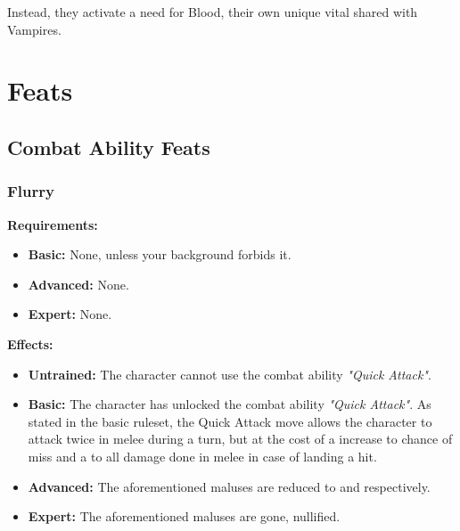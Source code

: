 \documentclass[openany,10pt,a4paper]{book}
\begin{document}
 Instead, they activate a need for Blood, their own unique vital shared with Vampires.\newpage
\chapter{Feats}
\section{Combat Ability Feats}
\subsection{Flurry}
\begin{table}[!ht]
\centering
{}
\end{table}
\textbf{Requirements:}
\begin{itemize}
	\item \textbf{Basic:} None, unless your background forbids it.
	\item \textbf{Advanced:} None.
	\item \textbf{Expert:} None.
\end{itemize}
\textbf{Effects:}
\begin{itemize}
	\item \textbf{Untrained:} The character cannot use the combat ability \textit{"Quick Attack"}.
	\item \textbf{Basic:} The character has unlocked the combat ability \textit{"Quick Attack"}. As stated in the basic ruleset, the Quick Attack move allows the character to attack twice in melee during a turn, but at the cost of a  increase to chance of miss and a  to all damage done in melee in case of landing a hit.
	\item \textbf{Advanced:} The aforementioned maluses are reduced to  and  respectively.
	\item \textbf{Expert:} The aforementioned maluses are gone, nullified.
\end{itemize}\newpage
\end{document}
